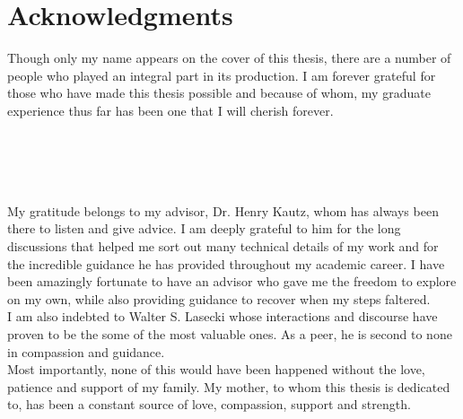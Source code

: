 \newpage                                             \chapter{Acknowledgments}

Though only my name appears on the cover of this thesis, there are a number of
people who played an integral part in its production. I am forever grateful for
those  who have made this thesis possible and because of whom, my graduate
experience thus far has been one that I will cherish forever.\\\\\\\\\


My gratitude belongs to my advisor, Dr. Henry Kautz, whom has always been there
to listen and give advice. I am deeply grateful to him for the long
discussions that helped me sort out many technical details of my work and for
the incredible guidance he has provided throughout my academic career. I have
been amazingly fortunate to have an advisor who gave me the freedom to explore
on my own, while also providing guidance to recover when my steps faltered.\\


I am also indebted to Walter S. Lasecki whose interactions and discourse have
proven to be the some of the most valuable ones.  As a peer, he is second to
none in compassion and guidance.\\

Most importantly, none of this would have been happened without the love,
patience and support of my family. My mother, to whom this thesis is
dedicated to, has been a constant source of love, compassion, support and
strength.
